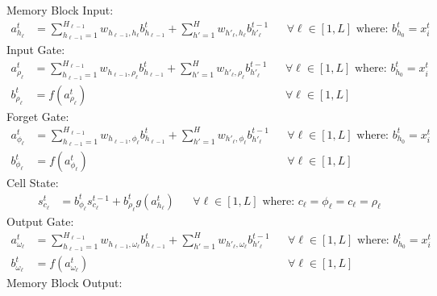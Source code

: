 \begin{equationbox}[H]
Memory Block Input:
\begin{equation*}
\begin{aligned}
a_{h_\ell}^t &= \sum_{h_{\ell-1}=1}^{H_{\ell-1}} w_{h_{\ell-1}, h_\ell} b_{h_{\ell-1}}^t + \sum_{h'=1}^H w_{h'_\ell, h_\ell} b_{h'_\ell}^{t-1} && \forall \ell \in [1, L] \text{ where: } b_{h_0}^t = x_i^t
\end{aligned}
\end{equation*}
Input Gate:
\begin{equation*}
\begin{aligned}
a_{\rho_\ell}^t &= \sum_{h_{\ell-1}=1}^{H_{\ell-1}} w_{h_{\ell-1}, \rho_\ell} b_{h_{\ell-1}}^t + \sum_{h'=1}^H w_{h'_\ell, \rho_\ell} b_{h'_\ell}^{t-1} && \forall \ell \in [1, L] \text{ where: } b_{h_0}^t = x_i^t \\
b_{\rho_\ell}^t &= f(a_{\rho_\ell}^t) && \forall \ell \in [1, L] 
\end{aligned}
\end{equation*}
Forget Gate:
\begin{equation*}
\begin{aligned}
a_{\phi_\ell}^t &= \sum_{h_{\ell-1}=1}^{H_{\ell-1}} w_{h_{\ell-1}, \phi_\ell} b_{h_{\ell-1}}^t + \sum_{h'=1}^H w_{h'_\ell, \phi_\ell} b_{h'_\ell}^{t-1} && \forall \ell \in [1, L] \text{ where: } b_{h_0}^t = x_i^t\\
b_{\phi_\ell}^t &= f(a_{\phi_\ell}^t) && \forall \ell \in [1, L] 
\end{aligned}
\end{equation*}
Cell State:
\begin{equation*}
\begin{aligned}
s_{c_\ell}^t &= b_{\phi_\ell}^t s_{c_\ell}^{t-1} + b_{\rho_\ell}^t g(a_{h_\ell}^t) && \forall \ell \in [1, L] \text{ where: } c_\ell = \phi_\ell = c_\ell = \rho_\ell
\end{aligned}
\end{equation*}
Output Gate:
\begin{equation*}
\begin{aligned}
a_{\omega_\ell}^t &= \sum_{h_{\ell-1}=1}^{H_{\ell-1}} w_{h_{\ell-1}, \omega_\ell} b_{h_{\ell-1}}^t + \sum_{h'=1}^H w_{h'_\ell, \omega_\ell} b_{h'_\ell}^{t-1} && \forall \ell \in [1, L] \text{ where: } b_{h_0}^t = x_i^t \\
b_{\omega_\ell}^t &= f(a_{\omega_\ell}^t) && \forall \ell \in [1, L] 
\end{aligned}
\end{equation*}
Memory Block Output:

\end{equationbox}
